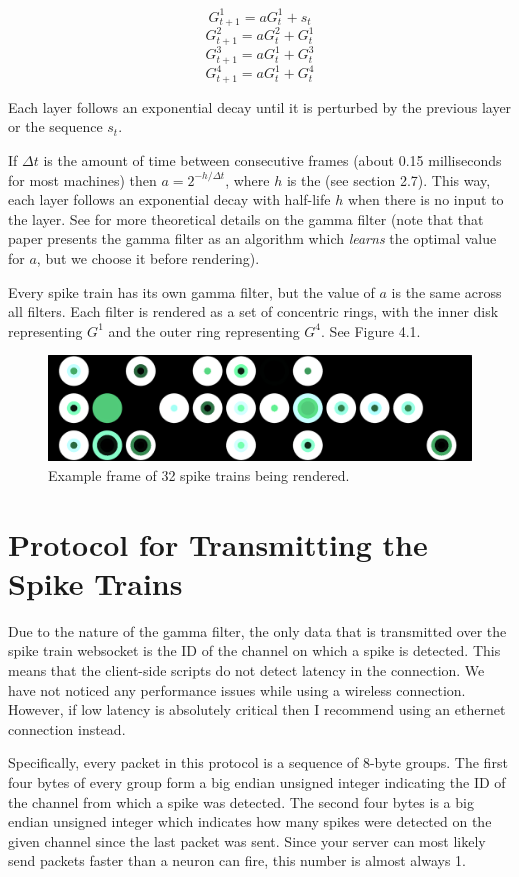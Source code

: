 \documentclass[12pt, openany]{book}
\begin{document}
$$G^1_{t+1}=aG^1_t+s_t$$
$$G^2_{t+1}=aG^2_t+G^1_t$$
$$G^3_{t+1}=aG^1_t+G^3_t$$
$$G^4_{t+1}=aG^1_t+G^4_t$$

Each layer follows an exponential decay until it is perturbed by the previous layer or the sequence $s_t$.

If $\Delta t$ is the amount of time between consecutive frames (about 0.15 milliseconds for most machines) then $a=2^{-h/\Delta t}$, where $h$ is the  (see section 2.7). This way, each layer follows an exponential decay with half-life $h$ when there is no input to the layer. See \cite{gammafilter} for more theoretical details on the gamma filter (note that that paper presents the gamma filter as an algorithm which \textit{learns} the optimal value for $a$, but we choose it before rendering).

Every spike train has its own gamma filter, but the value of $a$ is the same across all filters. Each filter is rendered as a set of concentric rings, with the inner disk representing $G^1$ and the outer ring representing $G^4$. See Figure 4.1.

\begin{figure}
    \includegraphics[width=\linewidth]{spikes.png}
    \caption{Example frame of 32 spike trains being rendered.}
\end{figure}

\section{Protocol for Transmitting the Spike Trains}

Due to the nature of the gamma filter, the only data that is transmitted over the spike train websocket is the ID of the channel on which a spike is detected. This means that the client-side scripts do not detect latency in the connection. We have not noticed any performance issues while using a wireless connection. However, if low latency is absolutely critical then I recommend using an ethernet connection instead.

Specifically, every packet in this protocol is a sequence of 8-byte groups. The first four bytes of every group form a big endian unsigned integer indicating the ID of the channel from which a spike was detected. The second four bytes is a big endian unsigned integer which indicates how many spikes were detected on the given channel since the last packet was sent. Since your server can most likely send packets faster than a neuron can fire, this number is almost always 1.
\end{document}
